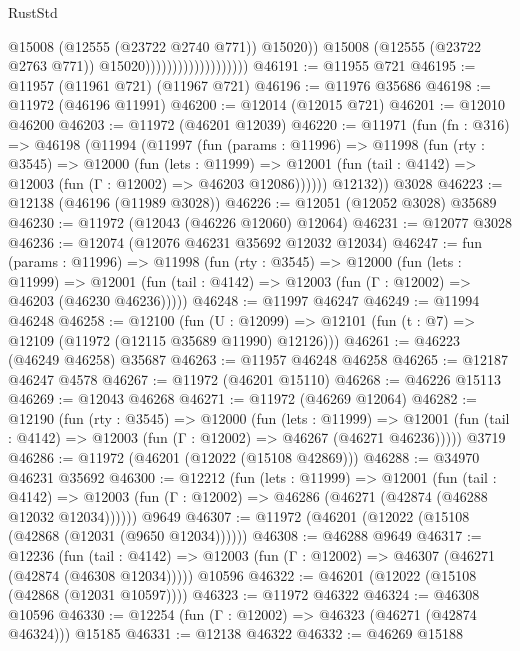 \begin{lexlean}{RustStd}
\begin{coremodule}
                                              @15008
                                              (@12555 (@23722 @2740 @771))
                                              @15020))
                                          @15008
                                          (@12555 (@23722 @2763 @771))
                                          @15020)))))))))))))))))))
@46191 := @11955 @721
@46195 := @11957 (@11961 @721) (@11967 @721)
@46196 := @11976 @35686
@46198 := @11972 (@46196 @11991)
@46200 := @12014 (@12015 @721)
@46201 := @12010 @46200
@46203 := @11972 (@46201 @12039)
@46220 := @11971
    (fun (fn : @316) =>
    @46198
      (@11994
        (@11997
          (fun (params : @11996) =>
          @11998
            (fun (rty : @3545) =>
            @12000
              (fun (lets : @11999) =>
              @12001 (fun (tail : @4142) => @12003 (fun (Γ : @12002) => @46203 @12086))))))
        @12132))
    @3028
@46223 := @12138 (@46196 (@11989 @3028))
@46226 := @12051 (@12052 @3028) @35689
@46230 := @11972 (@12043 (@46226 @12060) @12064)
@46231 := @12077 @3028
@46236 := @12074 (@12076 @46231 @35692 @12032 @12034)
@46247 := fun (params : @11996) =>
  @11998
    (fun (rty : @3545) =>
    @12000
      (fun (lets : @11999) =>
      @12001 (fun (tail : @4142) => @12003 (fun (Γ : @12002) => @46203 (@46230 @46236)))))
@46248 := @11997 @46247
@46249 := @11994 @46248
@46258 := @12100
    (fun (U : @12099) => @12101 (fun (t : @7) => @12109 (@11972 (@12115 @35689 @11990) @12126)))
@46261 := @46223 (@46249 @46258) @35687
@46263 := @11957 @46248 @46258
@46265 := @12187 @46247 @4578
@46267 := @11972 (@46201 @15110)
@46268 := @46226 @15113
@46269 := @12043 @46268
@46271 := @11972 (@46269 @12064)
@46282 := @12190
    (fun (rty : @3545) =>
    @12000
      (fun (lets : @11999) =>
      @12001 (fun (tail : @4142) => @12003 (fun (Γ : @12002) => @46267 (@46271 @46236)))))
    @3719
@46286 := @11972 (@46201 (@12022 (@15108 @42869)))
@46288 := @34970 @46231 @35692
@46300 := @12212
    (fun (lets : @11999) =>
    @12001
      (fun (tail : @4142) =>
      @12003 (fun (Γ : @12002) => @46286 (@46271 (@42874 (@46288 @12032 @12034))))))
    @9649
@46307 := @11972 (@46201 (@12022 (@15108 (@42868 (@12031 (@9650 @12034))))))
@46308 := @46288 @9649
@46317 := @12236
    (fun (tail : @4142) => @12003 (fun (Γ : @12002) => @46307 (@46271 (@42874 (@46308 @12034)))))
    @10596
@46322 := @46201 (@12022 (@15108 (@42868 (@12031 @10597))))
@46323 := @11972 @46322
@46324 := @46308 @10596
@46330 := @12254 (fun (Γ : @12002) => @46323 (@46271 (@42874 @46324))) @15185
@46331 := @12138 @46322
@46332 := @46269 @15188

\end{coremodule}
\end{lexlean}
